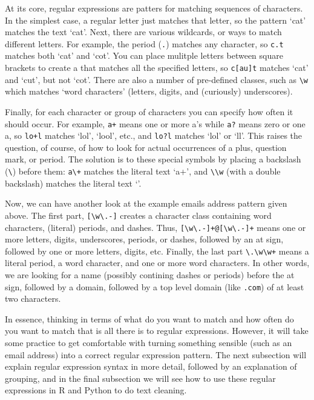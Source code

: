 At its core, regular expressions are patters for matching sequences of characters.
In the simplest case, a regular letter just matches that letter, so the pattern `cat' matches the text `cat'.
Next, there are various wildcards, or ways to match different letters.
For example, the period (\verb|.|) matches any character, so \verb|c.t| matches both `cat' and `cot'.
You can place mulitple letters between square brackets to create a  that matches all the specified letters, so \verb|c[au]t| matches `cat' and `cut', but not `cot'.
There are also a number of pre-defined classes, such as \verb|\w| which matches `word characters' (letters, digits, and (curiously) underscores).

Finally, for each character or group of characters you can specify how often it should occur.
For example, \verb|a+| means one or more a's while \verb|a?| means zero or one a, so \verb|lo+l| matches `lol', `lool', etc.,
and \verb|lo?l| matches `lol' or `ll'.
This raises the question, of course, of how to look for actual occurrences of a plus, question mark, or period.
The solution is to  these special symbols by placing a backslash (\verb|\|) before them:
\verb|a\+| matches the literal text `a+', and \verb|\\w| (with a double backslash) matches the literal text `'. 

Now, we can have another look at the example emails address pattern given above.
The first part, \verb|[\w\.-]| creates a character class containing word characters, (literal) periods, and dashes.
Thus, \verb|[\w\.-]+@[\w\.-]+| means one or more letters, digits, underscores, periods, or dashes, followed by an at sign,
followed by one or more letters, digits, etc.
Finally, the last part \verb|\.\w\w+| means a literal period, a word character, and one or more word characters.
In other words, we are looking for a name (possibly contining dashes or periods) before the at sign,
followed by a domain, followed by a top level domain (like \verb|.com|) of at least two characters.

In essence, thinking in terms of what do you want to match and how often do you want to match that is all there is to regular expressions.
However, it will take some practice to get comfortable with turning something sensible (such as an email address) into a correct regular expression pattern.
The next subsection will explain regular expression syntax in more detail, followed by an explanation of grouping,
and in the final subsection we will see how to use these regular expressions in R and Python to do text cleaning. 

